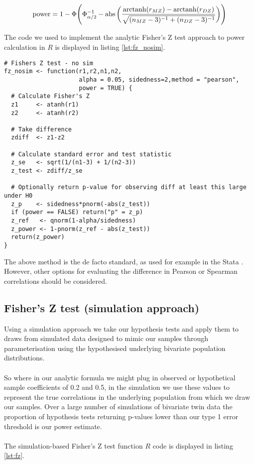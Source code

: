 $$ \operatorname{power} = 1- \Phi \Bigg(\Phi_{\alpha/2}^{-1} -  \operatorname{abs}\bigg(  \frac{\operatorname{arctanh}(r_{MZ}) - \operatorname{arctanh}(r_{DZ})}{\sqrt{(n_{MZ}-3)^{-1} + (n_{DZ}-3)^{-1}}}  \bigg)  \Bigg) $$ 

The code we used to implement the analytic Fisher's Z test approach to power calculation in $R$ is displayed in listing \ref{lst:fz_nosim}.

\begin{lstlisting}[float=h,caption={Fisher's Z test (analytic approach)},label={lst:fz_nosim}]
# Fishers Z test - no sim
fz_nosim <- function(r1,r2,n1,n2,
                     alpha = 0.05, sidedness=2,method = "pearson",
                     power = TRUE) {
  # Calculate Fisher's Z
  z1     <- atanh(r1)
  z2     <- atanh(r2)
  
  # Take difference
  zdiff  <- z1-z2
  
  # Calculate standard error and test statistic
  z_se   <- sqrt(1/(n1-3) + 1/(n2-3))
  z_test <- zdiff/z_se
  
  # Optionally return p-value for observing diff at least this large under H0
  z_p    <- sidedness*pnorm(-abs(z_test))
  if (power == FALSE) return("p" = z_p)
  z_ref   <- qnorm(1-alpha/sidedness)
  z_power <- 1-pnorm(z_ref - abs(z_test))
  return(z_power)
}
\end{lstlisting}

The above method is the de facto standard, as used for example in the Stata  \cite{StataCorp2013}.  However, other options for evaluating the difference in Pearson or Spearman correlations should be considered.  

\subsection{Fisher's Z test (simulation approach)}
Using a simulation approach we take our hypothesis tests and apply them to draws from simulated data designed to mimic our samples through parameterisation using the hypothesised underlying bivariate population distributions.  
\\
\\
So where in our analytic formula we might plug in observed or hypothetical sample coefficients of 0.2 and 0.5, in the simulation we use these values to represent the true correlations in the underlying population from which we draw our samples.  Over a large number of simulations of bivariate twin data the proportion of hypothesis tests returning p-values lower than our type 1 error threshold is our power estimate.
\\
\\
The simulation-based Fisher's Z test function $R$ code is displayed in listing \ref{lst:fz}.

